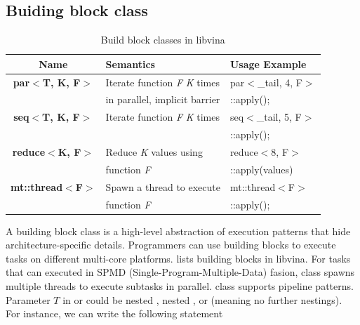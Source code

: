 \subsection{Buiding block class}
\label{sect:bb}

\begin{table}[hbt]
\caption{Build block classes in libvina}
\begin{tabular}{|c|l|l|}
\hline
Name& Semantics& Usage Example\\
\hline
\textbf{par$<$T, K, F$>$}& Iterate function \textit{F} \textit{K} times &par$<$\_tail, 4, F$>$\\ 
                         &in parallel, implicit barrier                 &::apply();\\                
\hline
\textbf{seq$<$T, K, F$>$}& Iterate function \textit{F} \textit{K} times&seq$<$\_tail, 5, F$>$\\
                         &                                             &::apply();\\
\hline
\textbf{reduce$<$K, F$>$}&Reduce \textit{K} values using &reduce$<$8, F$>$\\
&function
\textit{F}&::apply(values)\\
\hline
\textbf{mt::thread$<$F$>$}&Spawn a thread to execute  & mt::thread$<$F$>$\\
                          &function \textit{F}        & ::apply();\\
\hline
\end{tabular}\label{tbl:bb}
\end{table}

A building block class is a high-level abstraction of execution patterns that
hide architecture-specific details. Programmers can use building blocks to
execute tasks on different multi-core platforms.
 lists building blocks in libvina. For tasks that can
executed in SPMD (Single-Program-Multiple-Data) fasion,  class spawns
multiple threads to execute subtasks in parallel.  class supports
pipeline patterns. Parameter $T$ in  or  could be nested
, nested , or  (meaning no further nestings).
For instance, we can write the following statement 


